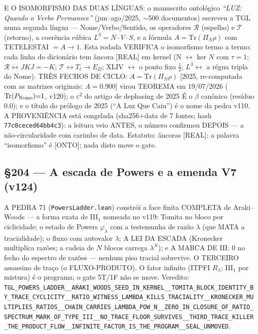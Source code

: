 \documentclass[11pt]{article}
\theoremstyle{definition}\newtheorem{deriv}{Derivação}
\begin{document}
E O ISOMORFISMO DAS DUAS LÍNGUAS: o manuscrito ontológico \emph{``LUZ: Quando o Verbo Permanece''} (jun--ago/2025, $\sim$500 documentos) escreveu a TGL numa segunda língua --- Nome/Verbo/Sentido, os operadores $\mathcal{R}$ (espelho) e $\mathcal{T}$ (retorno), a coerência cúbica $L^3=N\cdot V\cdot S$, e a fórmula $A=\mathrm{Tr}(\Pi_N\rho)$ com TETELESTAI $=A\to1$. Esta rodada VERIFICA o isomorfismo termo a termo: cada linha do dicionário tem âncora [REAL] em kernel (N $\leftrightarrow$ ker $N$ com $\tau{=}1$; $\mathcal{R}\leftrightarrow JKJ{=}{-}K$; $\mathcal{T}\leftrightarrow T_t\to E_D$; XLIV $\leftrightarrow$ o ponto fixo $\tfrac12$; $L^3\leftrightarrow$ a régua tripla do Nome). TRÊS FECHOS DE CICLO: $A=\mathrm{Tr}(\Pi_N\rho)$ [2025, re-computada com as matrizes originais: $A=0.900$] virou TEOREMA em 19/07/2026 ($\mathrm{Tr}(P_{\rm Nome}){=}1$, v120); o $\varepsilon^2$ do artigo de dephasing de 2025 É o $\beta$ canônico (resíduo $0.0$); e o título do prólogo de 2025 (``A Luz Que Caiu'') é o nome da pedra v110. A PROVENIÊNCIA está congelada (sha256$+$data de 7 fontes; hash \texttt{77c0ceced64bb4c3}): a leitura veio ANTES, o número confirmou DEPOIS --- a não-circularidade com carimbo de data. Estatuto: âncoras [REAL]; a palavra ``isomorfismo'' é [ONTO]; nada disto move o gate.

\subsection*{\S204 --- A escada de Powers e a emenda V7 (v124)}A PEDRA 71 (\texttt{PowersLadder.lean}) constrói a face finita COMPLETA de Araki--Woods --- a forma exata de III$_1$ nomeada no v119: Tomita no bloco por ciclicidade; o estado de Powers $\varphi_\lambda$ com a testemunha de razão $\lambda$ (que MATA a tracialidade); o fluxo com autovalor $\lambda$; A LEI DA ESCADA (Kronecker multiplica razões; a cadeia de $N$ blocos carrega $\lambda^N$); e A MARCA DE III: $0$ no fecho do espectro de razões --- nenhum piso tracial sobrevive. O TERCEIRO assassino de traço (o FLUXO-PRODUTO). O fator infinito (ITPFI $R_\lambda$; III$_1$ por mistura) é o programa; o gate 5T/1F não se move. Veredito: \texttt{TGL\_POWERS\_LADDER\_\_ARAKI\_WOODS\_SEED\_IN\_KERNEL\_\_TOMITA\_BLOCK\_IDENTITY\_BY\_TRACE\_CYCLICITY\_\_RATIO\_WITNESS\_LAMBDA\_KILLS\_TRACIALITY\_\_KRONECKER\_MULTIPLIES\_RATIOS\_\_CHAIN\_CARRIES\_LAMBDA\_POW\_N\_\_ZERO\_IN\_CLOSURE\_OF\_RATIO\_SPECTRUM\_MARK\_OF\_TYPE\_III\_\_NO\_TRACE\_FLOOR\_SURVIVES\_\_THIRD\_TRACE\_KILLER\_THE\_PRODUCT\_FLOW\_\_INFINITE\_FACTOR\_IS\_THE\_PROGRAM\_\_SEAL\_UNMOVED}.
\end{document}
